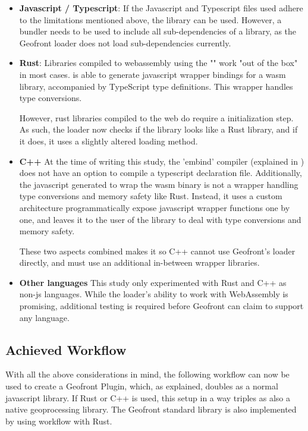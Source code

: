 \begin{itemize}[-]
  \item \textbf{Javascript / Typescript}: 
    If the Javascript and Typescript files used adhere to the limitations mentioned above, the library can be used. 
    However, a bundler needs to be used to include all sub-dependencies of a library, as the Geofront loader does not load sub-dependencies currently. 

  \item \textbf{Rust}:
    Libraries compiled to webassembly using the "" work "out of the box" in most cases.
     is able to generate javascript wrapper bindings for a \ac{wasm} library, accompanied by TypeScript type definitions. 
    This wrapper handles type conversions. 
    
    However, rust libraries compiled to the web do require a initialization step. 
    As such, the loader now checks if the library looks like a Rust library, and if it does, it uses a slightly altered loading method.
  \item \textbf{C++}
    At the time of writing this study, the 'embind' compiler (explained in ) does not have an option to compile a typescript declaration file. 
    Additionally, the javascript generated to wrap the wasm binary is not a wrapper handling type conversions and memory safety like Rust. 
    Instead, it uses a custom architecture programmatically expose javascript wrapper functions one by one, and leaves it to the user of the library to deal with type conversions and memory safety. 
    
    These two aspects combined makes it so C++ cannot use Geofront's loader directly, and must use an additional in-between wrapper libraries.

  \item \textbf{Other languages}
    This study only experimented with Rust and C++ as non-js languages.
    While the loader's ability to work with WebAssembly is promising, additional testing is required before Geofront can claim to support any language. 
\end{itemize}

\subsection{Achieved Workflow}

With all the above considerations in mind, the following workflow can now be used to create a Geofront Plugin, which, as explained, doubles as a normal javascript library. 
If Rust or C++ is used, this setup in a way triples as also a native geoprocessing library.
The Geofront standard library is also implemented by using workflow with Rust.

